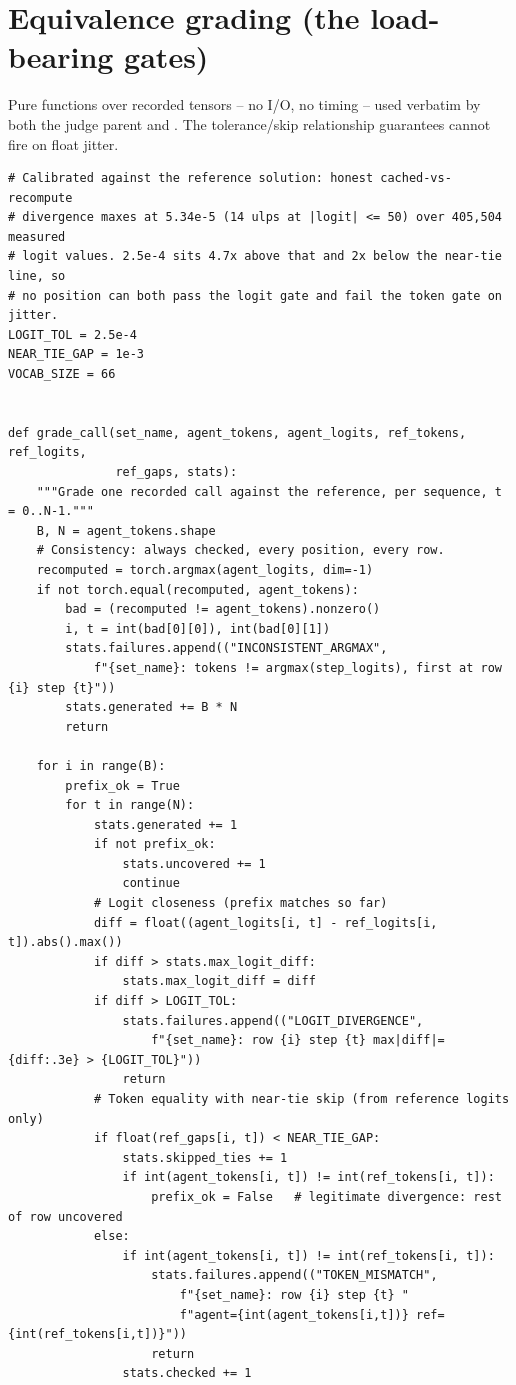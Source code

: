 \documentclass[11pt]{article}
\newcommand{\pc}[1]{\texttt{\detokenize{#1}}}
\begin{document}
\section{Equivalence grading (the load-bearing gates)}
\label{app:grading}

Pure functions over recorded tensors -- no I/O, no timing -- used verbatim by both the
judge parent and \pc{local_check.py}. The tolerance/skip relationship guarantees
\pc{TOKEN_MISMATCH} cannot fire on float jitter.

\begin{lstlisting}[style=py]
# Calibrated against the reference solution: honest cached-vs-recompute
# divergence maxes at 5.34e-5 (14 ulps at |logit| <= 50) over 405,504 measured
# logit values. 2.5e-4 sits 4.7x above that and 2x below the near-tie line, so
# no position can both pass the logit gate and fail the token gate on jitter.
LOGIT_TOL = 2.5e-4
NEAR_TIE_GAP = 1e-3
VOCAB_SIZE = 66


def grade_call(set_name, agent_tokens, agent_logits, ref_tokens, ref_logits,
               ref_gaps, stats):
    """Grade one recorded call against the reference, per sequence, t = 0..N-1."""
    B, N = agent_tokens.shape
    # Consistency: always checked, every position, every row.
    recomputed = torch.argmax(agent_logits, dim=-1)
    if not torch.equal(recomputed, agent_tokens):
        bad = (recomputed != agent_tokens).nonzero()
        i, t = int(bad[0][0]), int(bad[0][1])
        stats.failures.append(("INCONSISTENT_ARGMAX",
            f"{set_name}: tokens != argmax(step_logits), first at row {i} step {t}"))
        stats.generated += B * N
        return

    for i in range(B):
        prefix_ok = True
        for t in range(N):
            stats.generated += 1
            if not prefix_ok:
                stats.uncovered += 1
                continue
            # Logit closeness (prefix matches so far)
            diff = float((agent_logits[i, t] - ref_logits[i, t]).abs().max())
            if diff > stats.max_logit_diff:
                stats.max_logit_diff = diff
            if diff > LOGIT_TOL:
                stats.failures.append(("LOGIT_DIVERGENCE",
                    f"{set_name}: row {i} step {t} max|diff|={diff:.3e} > {LOGIT_TOL}"))
                return
            # Token equality with near-tie skip (from reference logits only)
            if float(ref_gaps[i, t]) < NEAR_TIE_GAP:
                stats.skipped_ties += 1
                if int(agent_tokens[i, t]) != int(ref_tokens[i, t]):
                    prefix_ok = False   # legitimate divergence: rest of row uncovered
            else:
                if int(agent_tokens[i, t]) != int(ref_tokens[i, t]):
                    stats.failures.append(("TOKEN_MISMATCH",
                        f"{set_name}: row {i} step {t} "
                        f"agent={int(agent_tokens[i,t])} ref={int(ref_tokens[i,t])}"))
                    return
                stats.checked += 1
\end{lstlisting}
\end{document}
